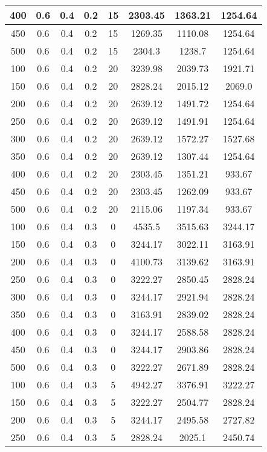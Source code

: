 \documentclass[a4paper, 12pt]{extreport}
\begin{document}
\begin{itemize}
\begin{longtable}{|c|c|c|c|c|c|c|c|}
			400 & 0.6 & 0.4 & 0.2 & 15 & 2303.45 & 1363.21 & 1254.64 \\\hline
			450 & 0.6 & 0.4 & 0.2 & 15 & 1269.35 & 1110.08 & 1254.64 \\\hline
			500 & 0.6 & 0.4 & 0.2 & 15 & 2304.3 & 1238.7 & 1254.64 \\\hline
			100 & 0.6 & 0.4 & 0.2 & 20 & 3239.98 & 2039.73 & 1921.71 \\\hline
			150 & 0.6 & 0.4 & 0.2 & 20 & 2828.24 & 2015.12 & 2069.0 \\\hline
			200 & 0.6 & 0.4 & 0.2 & 20 & 2639.12 & 1491.72 & 1254.64 \\\hline
			250 & 0.6 & 0.4 & 0.2 & 20 & 2639.12 & 1491.91 & 1254.64 \\\hline
			300 & 0.6 & 0.4 & 0.2 & 20 & 2639.12 & 1572.27 & 1527.68 \\\hline
			350 & 0.6 & 0.4 & 0.2 & 20 & 2639.12 & 1307.44 & 1254.64 \\\hline
			400 & 0.6 & 0.4 & 0.2 & 20 & 2303.45 & 1351.21 & 933.67 \\\hline
			450 & 0.6 & 0.4 & 0.2 & 20 & 2303.45 & 1262.09 & 933.67 \\\hline
			500 & 0.6 & 0.4 & 0.2 & 20 & 2115.06 & 1197.34 & 933.67 \\\hline
			100 & 0.6 & 0.4 & 0.3 & 0 & 4535.5 & 3515.63 & 3244.17 \\\hline
			150 & 0.6 & 0.4 & 0.3 & 0 & 3244.17 & 3022.11 & 3163.91 \\\hline
			200 & 0.6 & 0.4 & 0.3 & 0 & 4100.73 & 3139.62 & 3163.91 \\\hline
			250 & 0.6 & 0.4 & 0.3 & 0 & 3222.27 & 2850.45 & 2828.24 \\\hline
			300 & 0.6 & 0.4 & 0.3 & 0 & 3244.17 & 2921.94 & 2828.24 \\\hline
			350 & 0.6 & 0.4 & 0.3 & 0 & 3163.91 & 2839.02 & 2828.24 \\\hline
			400 & 0.6 & 0.4 & 0.3 & 0 & 3244.17 & 2588.58 & 2828.24 \\\hline
			450 & 0.6 & 0.4 & 0.3 & 0 & 3244.17 & 2903.86 & 2828.24 \\\hline
			500 & 0.6 & 0.4 & 0.3 & 0 & 3222.27 & 2671.89 & 2828.24 \\\hline
			100 & 0.6 & 0.4 & 0.3 & 5 & 4942.27 & 3376.91 & 3222.27 \\\hline
			150 & 0.6 & 0.4 & 0.3 & 5 & 3222.27 & 2504.77 & 2828.24 \\\hline
			200 & 0.6 & 0.4 & 0.3 & 5 & 3244.17 & 2495.58 & 2727.82 \\\hline
			250 & 0.6 & 0.4 & 0.3 & 5 & 2828.24 & 2025.1 & 2450.74 \\\hline

\end{longtable}
\end{itemize}
\end{document}

